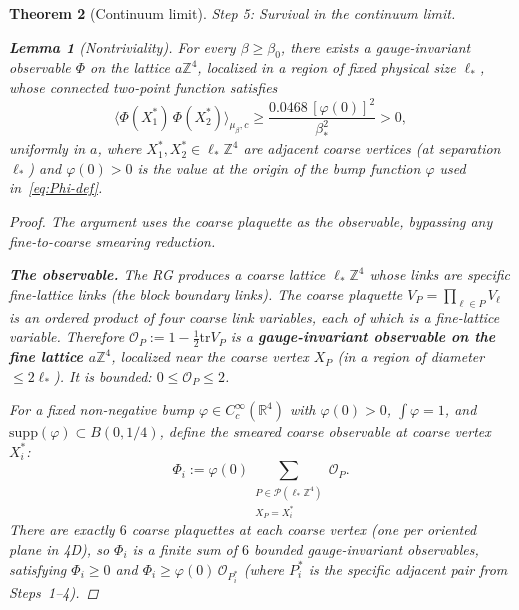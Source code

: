 \documentclass[11pt]{article}
\newtheorem{theorem}{Theorem}[section]
\newtheorem{lemma}[theorem]{Lemma}
\theoremstyle{definition}
\newcommand{\tr}{\mathrm{tr}}
\newcommand{\R}{\mathbb{R}}
\newcommand{\Z}{\mathbb{Z}}
\begin{document}
\begin{theorem}[Continuum limit]
\emph{Step 5: Survival in the continuum limit.}

\begin{lemma}[Nontriviality]\label{lem:nontriviality}
For every $\beta\ge\beta_0$, there exists a gauge-invariant
observable $\Phi$ on the lattice $a\Z^4$, localized in a
region of fixed physical size $\ell_*$, whose connected
two-point function satisfies
\begin{equation}\label{eq:nontriviality-lemma}
\langle\Phi(X_1^*)\,\Phi(X_2^*)\rangle_{\mu_\beta,c}
\ge\frac{0.0468\,[\varphi(0)]^2}{\beta_*^2}>0,
\end{equation}
uniformly in $a$, where $X_1^*,X_2^*\in\ell_*\Z^4$ are
adjacent coarse vertices (at separation $\ell_*$) and
$\varphi(0)>0$ is the value at the origin of the bump
function $\varphi$ used in~\eqref{eq:Phi-def}.
\end{lemma}

\begin{proof}
The argument uses the coarse plaquette as the observable,
bypassing any fine-to-coarse smearing reduction.

\textbf{The observable.}
The RG produces a coarse lattice $\ell_*\Z^4$ whose links
are specific fine-lattice links (the block boundary links).
The coarse plaquette $V_P=\prod_{\ell\in P}V_\ell$ is an
ordered product of four coarse link variables, each of which
is a fine-lattice variable.  Therefore
$\mathcal{O}_P:=1-\frac{1}{2}\tr V_P$
is a \textbf{gauge-invariant observable on the fine lattice
$a\Z^4$}, localized near the coarse vertex $X_P$
(in a region of diameter $\le 2\ell_*$).
It is bounded: $0\le\mathcal{O}_P\le 2$.

For a fixed non-negative bump $\varphi\in C_c^\infty(\R^4)$
with $\varphi(0)>0$, $\int\varphi=1$, and
$\mathrm{supp}(\varphi)\subset B(0,1/4)$, define
the smeared coarse observable at coarse vertex $X_i^*$:
\begin{equation}\label{eq:Phi-def}
\Phi_i:=\varphi(0)\sum_{\substack{P\in\mathcal{P}(\ell_*\Z^4)\\
X_P=X_i^*}}\mathcal{O}_P.
\end{equation}
There are exactly $6$ coarse plaquettes at each coarse
vertex (one per oriented plane in 4D), so $\Phi_i$ is a
finite sum of $6$ bounded gauge-invariant observables,
satisfying $\Phi_i\ge 0$ and
$\Phi_i\ge\varphi(0)\,\mathcal{O}_{P_i^*}$ (where $P_i^*$
is the specific adjacent pair from Steps~1--4).


\end{proof}
\end{theorem}
\end{document}
